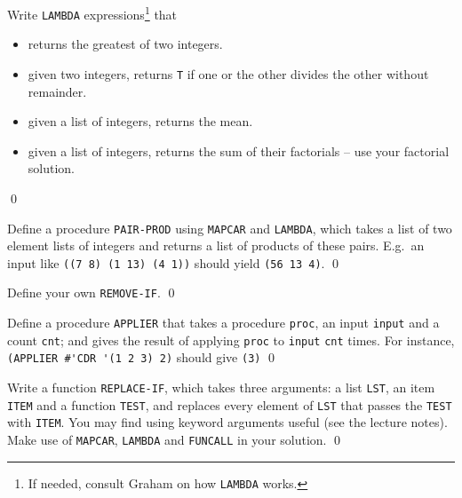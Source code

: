 \documentclass[a4paper,11pt]{article}
\begin{document}
\noindent \hrulefill

\begin{uexercise}
Write \Verb+LAMBDA+ expressions\footnote{If needed, consult Graham on how \Verb+LAMBDA+ works.} that

\begin{itemize}
\item returns the greatest of two integers.
\item given two integers,  returns \Verb+T+ if one or the other divides the other without remainder.
\item given a list of integers, returns the mean.
\item given a list of integers, returns the sum of their factorials -- use your factorial solution.
\end{itemize}

\qed
\end{uexercise}

\begin{uexercise}
 Define a procedure \Verb+PAIR-PROD+ using \Verb+MAPCAR+ and \Verb+LAMBDA+, which takes a list of two element lists of integers and returns a list of products of these pairs. E.g.\  an input like \Verb+((7 8) (1 13) (4 1))+ should yield \Verb+(56 13 4)+.
\qed
\end{uexercise}

\begin{uexercise}
Define your own \Verb+REMOVE-IF+.
\qed
\end{uexercise}

\begin{uexercise}

Define a procedure \Verb+APPLIER+ that takes a procedure \Verb+proc+, an input \Verb+input+ and a count \Verb+cnt+; and gives the result of applying \Verb+proc+ to \Verb+input+ \Verb+cnt+ times. For instance, \Verb+(APPLIER #'CDR '(1 2 3) 2)+ should give \Verb+(3)+
\qed
\end{uexercise}


\begin{uexercise}

Write a function \Verb+REPLACE-IF+, which takes three arguments: a list \Verb+LST+, an item \Verb+ITEM+ and a function \Verb+TEST+, and replaces every element of \Verb+LST+ that passes the \Verb+TEST+ with \Verb+ITEM+. You may find using keyword arguments useful (see the lecture notes). Make use of \Verb+MAPCAR+, \Verb+LAMBDA+ and \Verb+FUNCALL+ in your solution.   
\qed
\end{uexercise}
\end{document}
